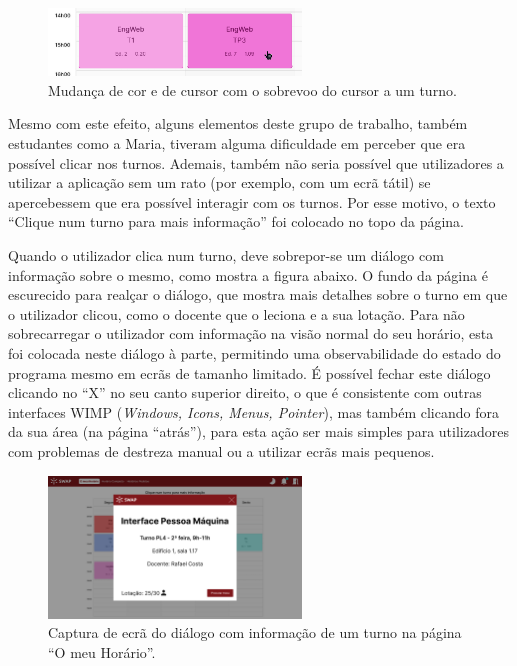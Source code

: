 \documentclass[12pt, a4paper]{article}
\begin{document}
\begin{figure}[H]
    \centering
    \includegraphics[width=0.6\textwidth]{res/prototype/turno-hover.png}
    \caption{Mudança de cor e de cursor com o sobrevoo do cursor a um turno.}
    \label{turno-hover}
\end{figure}

Mesmo com este efeito, alguns elementos deste grupo de trabalho, também estudantes como a Maria,
tiveram alguma dificuldade em perceber que era possível clicar nos turnos. Ademais, também não
seria possível que utilizadores a utilizar a aplicação sem um rato (por exemplo, com um ecrã tátil)
se apercebessem que era possível interagir com os turnos. Por esse motivo, o texto ``Clique num
turno para mais informação'' foi colocado no topo da página.

Quando o utilizador clica num turno, deve sobrepor-se um diálogo com informação sobre o mesmo, como
mostra a figura abaixo. O fundo da página é escurecido para realçar o diálogo, que mostra mais
detalhes sobre o turno em que o utilizador clicou, como o docente que o leciona e a sua lotação.
Para não sobrecarregar o utilizador com informação na visão normal do seu horário, esta foi colocada
neste diálogo à parte, permitindo uma observabilidade do estado do programa mesmo em ecrãs de
tamanho limitado. É possível fechar este diálogo clicando no ``X'' no seu canto superior direito, o
que é consistente com outras interfaces WIMP (\emph{Windows, Icons, Menus, Pointer}), mas também
clicando fora da sua área (na página ``atrás''), para esta ação ser mais simples para utilizadores
com problemas de destreza manual ou a utilizar ecrãs mais pequenos.

\begin{figure}[H]
    \centering
    \includegraphics[width=0.6\textwidth]{res/prototype/dialogo-informacao-turno.png}
    \caption{Captura de ecrã do diálogo com informação de um turno na página ``O meu Horário''.}
    \label{dialogo-informacao-turno}
\end{figure}
\end{document}
